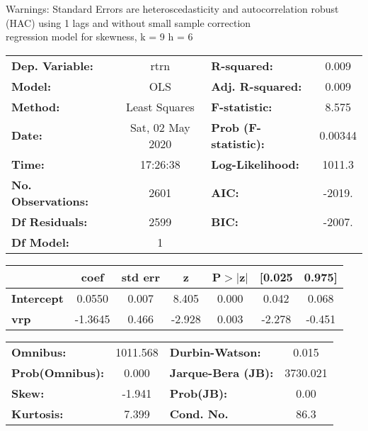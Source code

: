 Warnings: \newline
 [1] Standard Errors are heteroscedasticity and autocorrelation robust (HAC) using 1 lags and without small sample correction\\ 

regression model for skewness, k = 9 h = 6\begin{center}
\begin{tabular}{lclc}
\toprule
\textbf{Dep. Variable:}    &       rtrn       & \textbf{  R-squared:         } &     0.009   \\
\textbf{Model:}            &       OLS        & \textbf{  Adj. R-squared:    } &     0.009   \\
\textbf{Method:}           &  Least Squares   & \textbf{  F-statistic:       } &     8.575   \\
\textbf{Date:}             & Sat, 02 May 2020 & \textbf{  Prob (F-statistic):} &  0.00344    \\
\textbf{Time:}             &     17:26:38     & \textbf{  Log-Likelihood:    } &    1011.3   \\
\textbf{No. Observations:} &        2601      & \textbf{  AIC:               } &    -2019.   \\
\textbf{Df Residuals:}     &        2599      & \textbf{  BIC:               } &    -2007.   \\
\textbf{Df Model:}         &           1      & \textbf{                     } &             \\
\bottomrule
\end{tabular}
\begin{tabular}{lcccccc}
                   & \textbf{coef} & \textbf{std err} & \textbf{z} & \textbf{P$> |$z$|$} & \textbf{[0.025} & \textbf{0.975]}  \\
\midrule
\textbf{Intercept} &       0.0550  &        0.007     &     8.405  &         0.000        &        0.042    &        0.068     \\
\textbf{vrp}       &      -1.3645  &        0.466     &    -2.928  &         0.003        &       -2.278    &       -0.451     \\
\bottomrule
\end{tabular}
\begin{tabular}{lclc}
\textbf{Omnibus:}       & 1011.568 & \textbf{  Durbin-Watson:     } &    0.015  \\
\textbf{Prob(Omnibus):} &   0.000  & \textbf{  Jarque-Bera (JB):  } & 3730.021  \\
\textbf{Skew:}          &  -1.941  & \textbf{  Prob(JB):          } &     0.00  \\
\textbf{Kurtosis:}      &   7.399  & \textbf{  Cond. No.          } &     86.3  \\
\bottomrule
\end{tabular}
\end{center}

